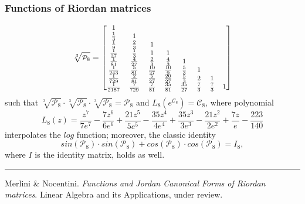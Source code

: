 \documentclass[9pt]{beamer}
\begin{document}
\begin{frame}[fragile]
\frametitle{Functions of Riordan matrices}
\begin{displaymath}
\footnotesize
    \sqrt[3]{\mathcal{P}_{8}}= \left[\begin{matrix}1 &  &  &  &  &  &  & \\\frac{1}{3} & 1 &  &  &  &  &  & \\\frac{1}{9} & \frac{2}{3} & 1 &  &  &  &  & \\\frac{1}{27} & \frac{1}{3} & 1 & 1 &  &  &  & \\\frac{1}{81} & \frac{4}{27} & \frac{2}{3} & \frac{4}{3} & 1 &  &  & \\\frac{1}{243} & \frac{5}{81} & \frac{10}{27} & \frac{10}{9} & \frac{5}{3} & 1 &  & \\\frac{1}{729} & \frac{2}{81} & \frac{5}{27} & \frac{20}{27} & \frac{5}{3} & 2 & 1 & \\\frac{1}{2187} & \frac{7}{729} & \frac{7}{81} & \frac{35}{81} & \frac{35}{27} & \frac{7}{3} & \frac{7}{3} & 1\end{matrix}\right]
\end{displaymath}
such that %
$\sqrt[3]{\mathcal{P}_8} \cdot \sqrt[3]{\mathcal{P}_8} \cdot
\sqrt[3]{\mathcal{P}_8} =\mathcal{P}_8$ and
$L_{8}\left({e^{\mathcal{C}_{8}}}\right) = \mathcal{C}_{8}$, where polynomial
\begin{displaymath}
{L_{ 8 }}{\left (z \right )} = \frac{z^{7}}{7 e^{7}} - \frac{7 z^{6}}{6 e^{6}} + \frac{21 z^{5}}{5 e^{5}} - \frac{35 z^{4}}{4 e^{4}} + \frac{35 z^{3}}{3 e^{3}} - \frac{21 z^{2}}{2 e^{2}} + \frac{7 z}{e} - \frac{223}{140}
\end{displaymath}
interpolates the $log$ function; moreover, the classic identity 
$$sin(\mathcal{P}_8)\cdot sin(\mathcal{P}_8)+
cos(\mathcal{P}_8)\cdot cos(\mathcal{P}_8)=I_{8},$$ 
where $I$ is the identity matrix, holds as well.
\vfill
\noindent\rule{\textwidth}{0.1pt}
{\footnotesize
Merlini \& Nocentini. \textit{Functions and Jordan Canonical Forms of Riordan
matrices}. \newline Linear Algebra and its Applications, under review.}
\end{frame}
\end{document}
